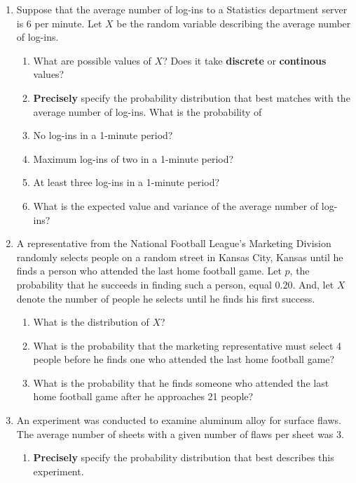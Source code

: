 \documentclass[11pt]{article}\usepackage[]{graphicx}\usepackage[]{color}
\begin{document}
\begin{enumerate}
  \item Suppose that the average number of log-ins to a Statistics department server is 6 per minute.  Let $X$ be the random variable describing the average number of log-ins.
          \begin{enumerate}
              \item What are possible values of $X$? Does it take \textbf{discrete} or \textbf{continous} values?
              \vspace{1cm}
              \item \textbf{Precisely} specify the probability distribution that best matches with the average number of log-ins.\vspace{1cm}
              What is the probability of 
              \item No log-ins in a 1-minute period?
              \vspace{2cm}
              \item Maximum log-ins of two in a 1-minute period?
              \vspace{3cm}
              \item At least three log-ins in a 1-minute period?
              \vspace{2cm}
              \item What is the expected value and variance of the average number of log-ins?
          \end{enumerate}
  \item A representative from the National Football League's Marketing Division randomly selects people on a random street in Kansas City, Kansas until he finds a person who attended the last home football game. Let $p$, the probability that he succeeds in finding such a person, equal $0.20$. And, let $X$ denote the number of people he selects until he finds his first success. 
          \begin{enumerate}
                \item What is the distribution of $X$?
                \vspace{1cm}
                \item What is the probability that the marketing representative must select 4 people before he finds one who attended the last home football game?
                \vspace{3cm}
                \item What is the probability that he finds someone who attended the last home football game after he approaches 21 people?
                \vspace{3cm}
          \end{enumerate}
  \item An experiment was conducted to examine aluminum alloy for surface flaws. The average number of sheets with a given number of flaws per sheet was 3. 
        \begin{enumerate}
            \item \textbf{Precisely} specify the probability distribution that best describes this experiment. 
            \vspace{1cm}
            

\end{enumerate}
\end{enumerate}
\end{document}
